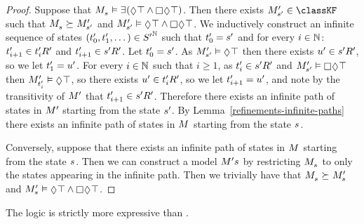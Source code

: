 \begin{proof}
Suppose that $\kPModel{\kStateS} \entails \somerefs (\possible \top \land \necessary \possible \top)$.
Then there exists $\kPModelP{\kStateSP} \in \classKF$ such that $\kPModel{\kStateS} \simulates \kPModelP{\kStateSP}$ and $\kPModelP{\kStateSP} \entails \possible \top \land \necessary \possible \top$.
We inductively construct an infinite sequence of states $({t}^{\prime}_0, {t}^{\prime}_1, \dots) \in {S^{\prime}}^{\mathbb{N}}$ such that ${t}^{\prime}_0 = {s}^{\prime}$ and for every $i \in \mathbb{N}$: ${t}^{\prime}_{i + 1} \in {{t}^{\prime}_i} {R^{\prime}_{}}$ and ${t}^{\prime}_{i + 1} \in {{s}^{\prime}} {R^{\prime}_{}}$.
Let ${t}^{\prime}_0 = {s}^{\prime}$.
As $\kPModelP{\kStateSP} \entails \possible \top$ then there exists ${u}^{\prime} \in {{s}^{\prime}} {R^{\prime}_{}}$, so we let ${t}^{\prime}_1 = {u}^{\prime}$.
For every $i \in \mathbb{N}$ such that $i \geq 1$, as ${t}^{\prime}_i \in {{s}^{\prime}} {R^{\prime}_{}}$ and $\kPModelP{\kStateSP} \entails \necessary \possible \top$ then $\kPModelP{\kStateTP_i} \entails \possible \top$, so there exists ${u}^{\prime} \in {{t}^{\prime}_i} {R^{\prime}_{}}$, so we let ${t}^{\prime}_{i + 1} = {u}^{\prime}$, and note by the transitivity of ${M^{\prime}_{}}$ that ${t}^{\prime}_{i + 1} \in {{s}^{\prime}} {R^{\prime}_{}}$.
Therefore there exists an infinite path of states in ${M^{\prime}_{}}$ starting from the state ${s}^{\prime}$.
By Lemma~\ref{refinements-infinite-paths} there exists an infinite path of states in $\kModel$ starting from the state $\kStateS$.

Conversely, suppose that there exists an infinite path of states in $\kModel$ starting from the state $\kStateS$.
Then we can construct a model $\kModelP{\kStateS}$ by restricting $\kPModel{\kStateS}$ to only the states appearing in the infinite path.
Then we trivially have that $\kPModel{\kStateS} \simulates \kPModelP{\kStateS}$ and $\kPModelP{\kStateS} \entails \possible \top \land \necessary \possible \top$.
\end{proof}

\begin{theorem}
The logic \logicRmlKF{} is strictly more expressive than \logicKF{}.
\end{theorem}

